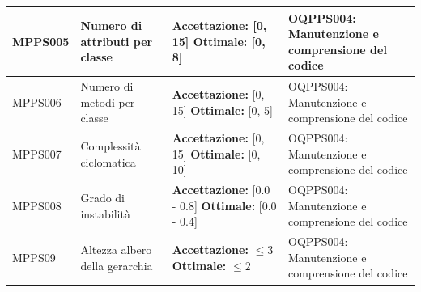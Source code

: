\documentclass[openany,12pt,a4paper]{report}
\begin{document}
\begin{longtable}{| p{2cm} | p{3.5cm} |p{5.5cm} | p{5.5cm} |}
		\hline
		
		\newline MPPS005 &
		\newline Numero di attributi per classe &
		\newline \textbf{Accettazione:} [0, 15] 
		\newline \textbf{Ottimale:} [0, 8] &
		\newline OQPPS004: Manutenzione e comprensione del codice
		\\[1em]
		
		\hline
		
		\newline MPPS006 &
		\newline Numero di metodi per classe &
		\newline \textbf{Accettazione:} [0, 15] 
		\newline \textbf{Ottimale:} [0, 5] &
		\newline OQPPS004: Manutenzione e comprensione del codice 
		\\[1em]
		
		\hline
		
		\newline MPPS007 &
		\newline Complessità ciclomatica &
		\newline \textbf{Accettazione:} [0, 15] 
		\newline \textbf{Ottimale:} [0, 10] &
		\newline OQPPS004: Manutenzione e comprensione del codice 
		\\[1em]
		
		\hline
		
		\newline MPPS008 &
		\newline Grado di instabilità &
		\newline \textbf{Accettazione:} [0.0 - 0.8] 
		\newline \textbf{Ottimale:} [0.0 - 0.4]&
		\newline OQPPS004: Manutenzione e comprensione del codice 
		\\[1em]
		
		\hline
		
		\newline MPPS09 &
		\newline Altezza albero della gerarchia &
		\newline \textbf{Accettazione:} $ \leq 3 $
		\newline \textbf{Ottimale:} $ \leq 2 $&
		\newline OQPPS004: Manutenzione e comprensione del codice 
		\\[1em]
		

\end{longtable}
\end{document}
